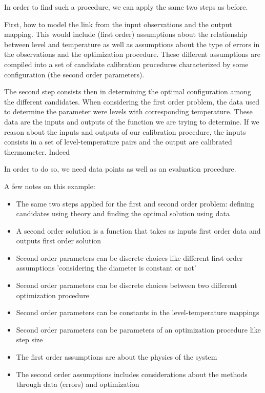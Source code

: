 \begin{bibunit}
In order to find such a procedure, we can apply the same two steps as before.

  First, how to model the link from the input observations and the output mapping. This would include (first order) assumptions about the relationship between level and temperature as well as assumptions about the type of errors in the observations and the optimization procedure. These different assumptions are compiled into a set of candidate calibration procedures characterized by some configuration (the second order parameters).

  The second step consists then in determining the optimal configuration among the different candidates.
  When considering the first order problem, the data used to determine the parameter were levels with corresponding temperature. These data are  the inputs and outputs of the function we are trying to determine.
  If we reason about the inputs and outputs of our calibration procedure, the inputs consists in a set of level-temperature pairs  and the output are calibrated thermometer.
  Indeed 
  
  In order to do so, we need data points as well as an evaluation procedure.


A few notes on this example:
\begin{itemize}
\item The same two steps applied for the first and second order problem: defining candidates using theory and finding the optimal solution using data
\item A second order solution is a function that takes as inputs first order data and outputs first order solution
\item Second order parameters can be discrete choices like different first order assumptions 'considering the diameter is constant or not'
\item Second order parameters can be discrete choices between two different optimization procedure
\item Second order parameters can be constants in the level-temperature mappings
\item Second order parameters can be parameters of an optimization procedure like step size
\item The first order assumptions are about the physics of the system 
\item The second order assumptions includes considerations about the methods through data (errors) and optimization
\end{itemize}


\end{bibunit}

